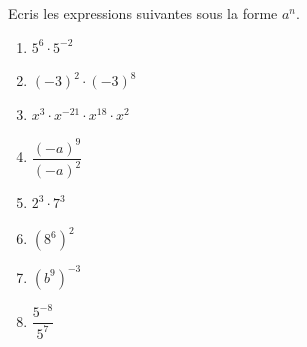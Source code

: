 %
%
  Ecris les expressions suivantes sous la forme $a^{n}$.
  \begin{enumerate}[cols=2]
    \item $5^{6} \cdot 5^{- 2}$
    \item $( - 3)^{2} \cdot ( - 3)^{8}$
    \item $x^{3} \cdot x^{- 21} \cdot x^{18} \cdot x^{2}$
    \item $\dfrac{( - a)^{9}}{( - a)^{2}}$
    \item $2^{3} \cdot 7^{3}$
    \item $\left(8^{6}\right)^2$
    \item $\left( b^{9} \right)^{- 3}$
    \item $\dfrac{5^{- 8}}{5^{7}}$
  \end{enumerate}
